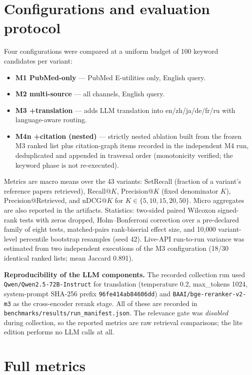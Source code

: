 \documentclass[11pt]{article}
\newcommand{\code}[1]{\texttt{#1}}
\begin{document}
\section{Configurations and evaluation protocol}
Four configurations were compared at a uniform budget of 100 keyword candidates
per variant:
\begin{itemize}\itemsep2pt
  \item \textbf{M1 PubMed-only} --- PubMed E-utilities only, English query.
  \item \textbf{M2 multi-source} --- all channels, English query.
  \item \textbf{M3 +translation} --- adds LLM translation into en/zh/ja/de/fr/ru
        with language-aware routing.
  \item \textbf{M4n +citation (nested)} --- strictly nested ablation built from
        the frozen M3 ranked list plus citation-graph items recorded in the
        independent M4 run, deduplicated and appended in traversal order
        (monotonicity verified; the keyword phase is not re-executed).
\end{itemize}
Metrics are macro means over the 43 variants: SetRecall (fraction of a variant's
reference papers retrieved), Recall@$K$, Precision@$K$ (fixed denominator $K$),
Precision@Retrieved, and nDCG@$K$ for $K\in\{5,10,15,20,50\}$. Micro aggregates
are also reported in the artifacts. Statistics: two-sided paired Wilcoxon
signed-rank tests with zeros dropped, Holm--Bonferroni correction over a
pre-declared family of eight tests, matched-pairs rank-biserial effect size, and
10{,}000 variant-level percentile bootstrap resamples (seed 42). Live-API
run-to-run variance was estimated from two independent executions of the M3
configuration (18/30 identical ranked lists; mean Jaccard 0.891).

\textbf{Reproducibility of the LLM components.} The recorded collection run used
\code{Qwen/Qwen2.5-72B-Instruct} for translation (temperature 0.2,
max\_tokens 1024, system-prompt SHA-256 prefix \code{96fe414ab84606dd}) and
\code{BAAI/bge-reranker-v2-m3} as the cross-encoder rerank stage. All of these
are recorded in \code{benchmarks/results/run\_manifest.json}. The relevance gate
was \emph{disabled} during collection, so the reported metrics are raw retrieval
comparisons; the lite edition performs no LLM calls at all.

\section{Full metrics}

\end{document}
